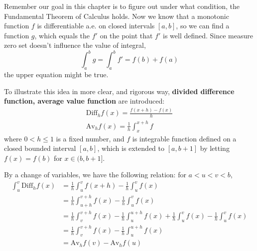 \documentclass[lang=en, 12pt]{elegantbook}
\begin{document}
        Remember our goal in this chapter is to figure out under what condition, the Fundamental Theorem of Calculus holds. Now we know 
    that a monotonic function $f$ is differentiable a.e. on closed intervals $[a,b]$, so we can find a function $g$, which equals the
    $f'$ on the point that $f'$ is well defined. Since measure zero set doesn't influence the value of integral, 
    $$\int_a^b g = \int_a^b f' = f(b) +f(a)$$
    the upper equation might be true.\par
        To illustrate this idea in more clear, and rigorous way, \textbf{divided difference function, average value function} are introduced:
        \begin{equation*}
            \begin{aligned}
                \mbox{Diff}_h f(x) = \frac{f(x+h) - f(x)}{h}\\
                \mbox{Av}_h f(x) = \frac{1}{h} \int_{x}^{x+h} f
            \end{aligned}
        \end{equation*}
        where $0 <h\leq 1$ is a fixed number, and $f$ is integrable function defined on a closed bounded interval $[a,b]$, which is extended
    to $[a,b+1]$ by letting $f(x) = f(b)$ for $x \in (b,b+1]$.\par
        \begin{remark}
            By a change of variables, we have the following relation: for $a<u<v<b$, 
            \begin{equation*}
                \begin{aligned}
                    \int_u^v \mbox{Diff}_h f(x) &= \frac{1}{h}\int_u^v f(x+h) - \frac{1}{h}\int_u^v f(x)\\
                    &= \frac{1}{h}\int_{u+h}^{v+h} f(x) - \frac{1}{h}\int_u^v f(x)\\
                    &= \frac{1}{h}\int_{v}^{v+h} f(x) - \frac{1}{h}\int_{u}^{u+h} f(x)+ \frac{1}{h}\int_{u}^{v} f(x) - \frac{1}{h}\int_u^v f(x)\\
                    &= \frac{1}{h}\int_{v}^{v+h} f(x) - \frac{1}{h}\int_{u}^{u+h} f(x)\\
                    &= \mbox{Av}_h f(v) - \mbox{Av}_h f(u)
                \end{aligned}
            \end{equation*}
        \end{remark}
        
\end{document}
